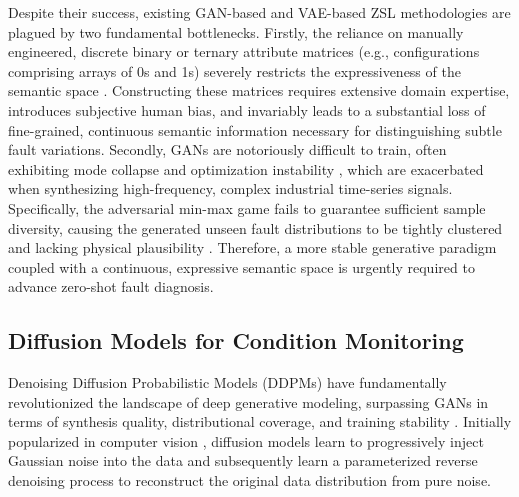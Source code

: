Despite their success, existing GAN-based and VAE-based ZSL methodologies are plagued by two fundamental bottlenecks. Firstly, the reliance on manually engineered, discrete binary or ternary attribute matrices (e.g., configurations comprising arrays of 0s and 1s) severely restricts the expressiveness of the semantic \cite{mikolov2013efficient} space \cite{mikolov2013efficient}. Constructing these matrices requires extensive domain expertise, introduces subjective human bias, and invariably leads to a substantial loss of fine-grained, continuous semantic \cite{radford2021learning} information necessary for distinguishing subtle fault variations. Secondly, GANs are notoriously difficult to train, often exhibiting mode collapse and optimization instability \cite{arjovsky2017wasserstein}, which are exacerbated when synthesizing high-frequency, complex industrial time-series signals. Specifically, the adversarial min-max game fails to guarantee sufficient sample diversity, causing the generated unseen fault distributions to be tightly clustered and lacking physical plausibility \cite{goodfellow2014generative}. Therefore, a more stable generative paradigm coupled with a continuous, expressive semantic space \cite{mikolov2013efficient} is urgently required to advance zero-shot fault diagnosis.

\subsection{Diffusion Models for Condition Monitoring}

Denoising Diffusion Probabilistic Models (DDPMs) have fundamentally revolutionized the landscape of deep generative modeling, surpassing GANs in terms of synthesis quality, distributional coverage, and training stability \cite{ho2020denoising}. Initially popularized in computer vision \cite{ho2020denoising}, diffusion models learn to progressively inject Gaussian noise into the data and subsequently learn a parameterized reverse denoising process to reconstruct the original data distribution from pure noise. 

